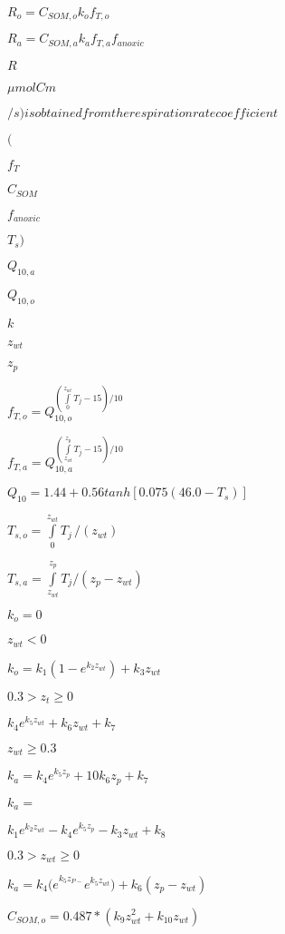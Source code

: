\documentclass{article}
\begin{document}
{$ R_{o}=C_{SOM,o}k_{o}f_{T,{o}} $
\pagebreak

$ R_{a}=C_{SOM,a}k_{a}f_{T,{a}}f_{anoxic} $
\pagebreak

$R$
\pagebreak

$\mu mol C m$
\pagebreak

$/s) is obtained from the respiration rate coefficient $
\pagebreak

$ ($
\pagebreak

$f_T$
\pagebreak

$C_{SOM}$
\pagebreak

$f_{anoxic}$
\pagebreak

$T_s)$
\pagebreak

$Q_{10,a}$
\pagebreak

$Q_{10,o}$
\pagebreak

$k$
\pagebreak

$z_{wt}$
\pagebreak

$z_p$
\pagebreak

$ f_{T,o} =Q_{10,o}^{\left(\int\limits_{0}^{z_{wt}} T_{j} -15\right)/10} $
\pagebreak

$ f_{T,{a}} =Q_{10,{a}}^{\left(\int\limits_{z_{wt}}^{z_\mathrm{p}} T_{j} -15\right)/10} $
\pagebreak

$ Q_{10}=1.44+0.56 {tanh}[0.075\left( 46.0-T_{s} \right)] $
\pagebreak

$ T_{s,o}=\int\limits_{0}^{z_{wt}} T_{j} \, /(z_{wt}) $
\pagebreak

$ T_{s,a}=\int\limits_{z_{wt}}^{z_{p}} T_{j} /(z_{p}-z_{wt}) $
\pagebreak

$ k_{o}= 0 $
\pagebreak

$ z_{wt}<0 $
\pagebreak

$ k_{o}= k_{1}\left( 1-e^{k_{2}z_{wt}} \right)+k_{3}z_{wt} $
\pagebreak

$0.3 > z_t \ge 0$
\pagebreak

$ k_{4}e^{k_{5}z_{wt}}+k_{6}z_{wt}+k_{7} $
\pagebreak

$ z_{wt}\ge 0.3 $
\pagebreak

$ k_{a}= k_{4}e^{k_{5}z_{p}}+{10k}_{6}z_{p}+k_{7} $
\pagebreak

$ k_{a} = $
\pagebreak

$ k_1 e^{ k_2 z_{wt} } - k_4 e^{k_5 z_p} -k_3 z_{wt}+k_8 $
\pagebreak

$0.3>z_{wt} \ge 0 $
\pagebreak

$ k_{a}= k_{4}{(e}^{k_{5}z_{P-}}e^{k_{5}z_{wt}})+k_{6}\left( z_p-z_{wt} \right)$
\pagebreak

$ C_{SOM,o}= 0.487\ast (k_{9}z_{wt}^{2}+k_{10}z_{wt}) $
\pagebreak

}
\end{document}
